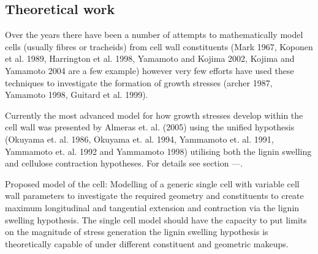 \documentclass{article}
\begin{document}

%



\subsection{Theoretical work}
Over the years there have been a number of attempts to mathematically model
cells (usually fibres or tracheids) from cell wall constituents (Mark 1967,
Koponen et al. 1989, Harrington et al. 1998, Yamamoto and Kojima 2002, Kojima
and Yamamoto 2004 are a few example) however very few efforts have used these
techniques to investigate the formation of growth stresses (archer 1987,
Yamamoto 1998, Guitard et al. 1999).

Currently the most advanced model for how growth stresses develop within the
cell wall was presented by Almeras et. al. (2005) using the unified hypothesis
(Okuyama et. al. 1986, Okuyama et. al. 1994, Yammamoto et. al. 1991, Yammamoto
et. al. 1992 and Yammamoto 1998) utilising both the lignin swelling and
cellulose contraction hypotheses. For details see section ---.

Proposed model of the cell:
Modelling of a generic single cell with variable cell wall parameters to
investigate the required geometry and constituents to create maximum
longitudinal and tangential extension and contraction via the lignin swelling
hypothesis. The single cell model should have the capacity to put limits on the
magnitude of stress generation the lignin swelling hypothesis is theoretically
capable of under different constituent and geometric makeups.
\end{document}
